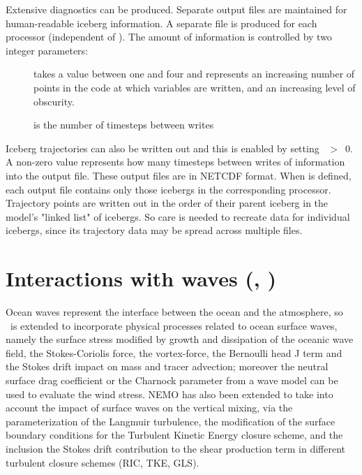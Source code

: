 \documentclass[../main/NEMO_manual]{subfiles}
\begin{document}
Extensive diagnostics can be produced.
Separate output files are maintained for human-readable iceberg information.
A separate file is produced for each processor (independent of ).
The amount of information is controlled by two integer parameters:
\begin{description}
\item [{}] takes a value between one and four and
  represents an increasing number of points in the code at which variables are written,
  and an increasing level of obscurity.
\item [{}] is the number of timesteps between writes
\end{description}

Iceberg trajectories can also be written out and this is enabled by setting ~$>$~0.
A non-zero value represents how many timesteps between writes of information into the output file.
These output files are in NETCDF format.
When  is defined, each output file contains only those icebergs in the corresponding processor.
Trajectory points are written out in the order of their parent iceberg in the model's "linked list" of icebergs.
So care is needed to recreate data for individual icebergs,
since its trajectory data may be spread across multiple files.

\section[Interactions with waves (\textit{sbcwave.F90}, \forcode{ln_wave})]{Interactions with waves (\protect{}, \protect{})}
\label{sec:SBC_wave}

\begin{listing}
  \caption{}
  \label{lst:namsbc_wave}
\end{listing}

Ocean waves represent the interface between the ocean and the atmosphere, so \NEMO\ is extended to incorporate
physical processes related to ocean surface waves, namely the surface stress modified by growth and
dissipation of the oceanic wave field, the Stokes-Coriolis force, the vortex-force, the Bernoulli head J term and the Stokes drift impact on mass and tracer advection; moreover the neutral surface drag coefficient or the Charnock parameter from a wave model can be used to evaluate the wind stress. NEMO has also been extended to take into account the impact of surface waves on the vertical mixing, via the parameterization of the Langmuir turbulence, the modification of the surface boundary conditions for the Turbulent Kinetic Energy closure scheme, and the inclusion the Stokes drift contribution to the shear production term in different turbulent closure schemes (RIC, TKE, GLS).\\
\end{document}
